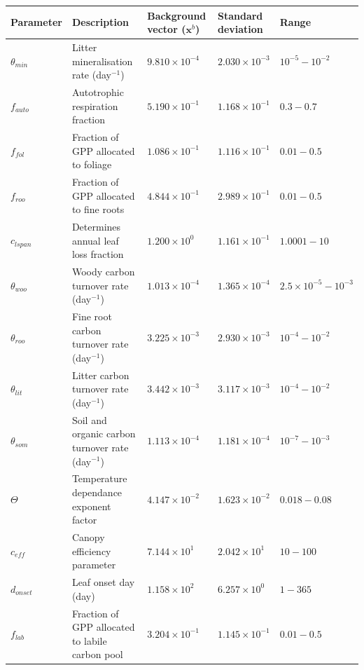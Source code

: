 \documentclass[11pt]{article}
\begin{document}
\begin{table}[ht] 
\begin{center}
	\begin{tabularx}{\textwidth}{| l | X | l | l | l |}
	\hline
	Parameter & Description & \pbox{7cm}{Background\\ vector ($\textbf{x}^{b}$)} & \pbox{7cm}{Standard \\deviation} & Range \\ \hline
$\theta_{min}$ & Litter mineralisation rate (day$^{-1}$) & $9.810\times 10^{-4}$ & $2.030\times 10^{-3}$ & $10^{-5} - 10^{-2}$ \\ \hline
$f_{auto}$ & Autotrophic respiration fraction & $5.190\times 10^{-1}$ & $1.168\times 10^{-1}$ & $0.3 - 0.7$  \\ \hline
$f_{fol}$ & Fraction of GPP allocated to foliage & $1.086\times 10^{-1}$ & $1.116\times 10^{-1}$ & $0.01-0.5$ \\ \hline
$f_{roo}$ & Fraction of GPP allocated to fine roots & $4.844\times 10^{-1}$ & $2.989\times 10^{-1}$ & $0.01-0.5$ \\ \hline
$c_{lspan}$ & Determines annual leaf loss fraction & $1.200\times 10^{0} $ & $1.161\times 10^{-1}$ & $1.0001 - 10$ \\ \hline
$\theta_{woo}$ & Woody carbon turnover rate (day$^{-1}$) & $1.013\times 10^{-4}$ & $1.365\times 10^{-4}$ & $2.5\times10^{-5} - 10^{-3}$ \\ \hline
$\theta_{roo}$ & Fine root carbon turnover rate (day$^{-1}$) & $3.225\times 10^{-3}$ & $2.930\times 10^{-3}$ & $10^{-4} - 10^{-2}$ \\ \hline
$\theta_{lit}$ & Litter carbon turnover rate (day$^{-1}$) & $3.442\times 10^{-3}$ & $3.117\times 10^{-3}$ & $10^{-4} - 10^{-2}$ \\ \hline
$\theta_{som}$ & Soil and organic carbon turnover rate (day$^{-1}$) & $1.113\times 10^{-4}$ & $1.181\times 10^{-4}$ & $10^{-7} - 10^{-3}$ \\ \hline
$\Theta$ & Temperature dependance exponent factor & $4.147\times 10^{-2}$ & $1.623\times 10^{-2}$ & $0.018 - 0.08$ \\ \hline
$c_{eff}$ & Canopy efficiency parameter & $7.144\times 10^{1}$ & $2.042\times 10^{1}$ & $10 - 100$ \\ \hline
$d_{onset}$ & Leaf onset day (day) & $1.158\times 10^{2}$ & $6.257\times 10^{0}$ & $1 - 365$ \\ \hline
$f_{lab}$ & Fraction of GPP allocated to labile carbon pool & $3.204\times 10^{-1}$ & $1.145\times 10^{-1}$ & $0.01 - 0.5$ \\ \hline

\end{tabularx}
\end{center}
\end{table}
\end{document}
